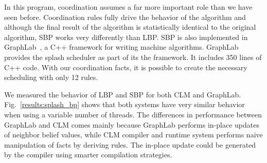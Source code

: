 \begin{dblfig}
\begin{center}
   \end{center}
\end{dblfig}

In this program, coordination assumes a far more important role than
we have seen before. Coordination rules fully drive the behavior of
the algorithm and although the final result of the algorithm is
statistically identical to the original algorithm, SBP works very
differently than LBP.  SBP is also implemented in
GraphLab~\cite{GraphLab2010}, a C++ framework for writing machine
algorithms.  GraphLab provides the splash scheduler as part of its the
framework. It includes 350 lines of C++ code.  With our coordination facts,
it is possible to create the necessary scheduling with only 12 rules.

We measured the behavior of LBP and SBP for both CLM and GraphLab.
Fig.~\ref{results:splash_bp} shows that both systems have very similar behavior
when using a variable number of threads.  The differences in performance between
GraphLab and CLM comes mainly because GraphLab performs in-place updates of
neighbor belief values, while CLM compiler and runtime system performs naive
manipulation of facts by deriving rules. The in-place update could be generated
by the compiler using smarter compilation strategies.
